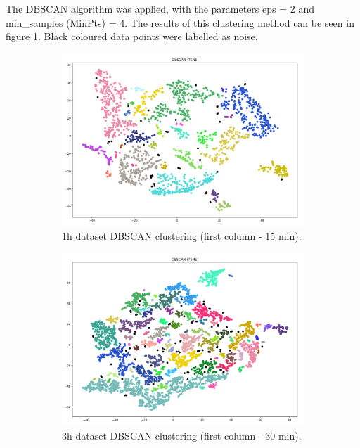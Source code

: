 The DBSCAN algorithm was applied, with the parameters eps = 2 and min\_samples (MinPts) = 4. The results of this clustering method can be seen in figure \ref{figure:DBSCANResults}. Black coloured data points were labelled as noise.


\begin{figure}[H]
  \centering
  \begin{subfigure}{.5\textwidth}\captionsetup{width=.8\linewidth}
    \centering
    \includegraphics[width=1\textwidth]{./images/clusteringResults/1h-1-DBSCAN.png}
  \caption{1h dataset DBSCAN clustering (first column - 15 min).}
  \end{subfigure}%
  \hfill
  \begin{subfigure}{.5\textwidth}\captionsetup{width=.8\linewidth}
    \centering
    \includegraphics[width=1\textwidth]{./images/clusteringResults/3h-1-DBSCAN.png}
    \caption{3h dataset DBSCAN clustering (first column - 30 min).}
  \end{subfigure}
  \caption{}
  \label{figure:DBSCANResults}
  \end{figure}


